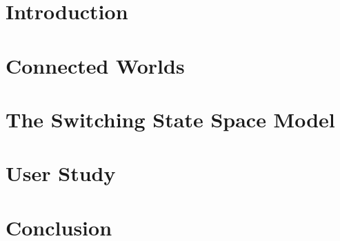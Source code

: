 \documentclass[11pt]{gsasthesis} %
\begin{document}
\newcommand{\indep}{\mathrel{\text{\scalebox{1.07}{$\perp\mkern-10mu\perp$}}}}

\tableofcontents %

\listoffigures



\chapter*{Introduction}\label{ch:intro}



\chapter{Connected Worlds}\label{ch:1}




\chapter{The Switching State Space Model}\label{ch:2}




\chapter{User Study}\label{ch:3}




\chapter{Conclusion}\label{ch:4}




\begin{singlespacing}
  \renewcommand{\bibname}{References}

  
  
\end{singlespacing}


\end{document}
